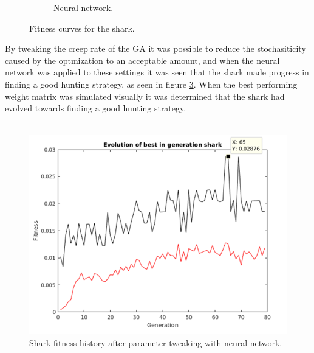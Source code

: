 \begin{figure}[htp]
\begin{center}
\begin{subfigure}[b]{0.5\textwidth}
 \caption[]{Neural network.}
 \label{fig:aifitness1}
\end{subfigure}
\caption{Fitness curves for the shark.}
\label{fig:fitness1}
\end{center}
\end{figure}

By tweaking the creep rate of the GA it was possible to reduce the
stochasiticity caused by the optmization to an acceptable amount, and when the
neural network was applied to these settings it was seen that the shark made
progress in finding a good hunting strategy, as seen in figure
\ref{fig:aifitness2}.
When the best performing weight matrix was simulated visually it was
determined that the shark had evolved towards finding a good hunting strategy.\\
\\
\begin{figure}[htp]
\begin{center}
  \includegraphics[width=\textwidth]{figs/goodfit.png}
  \caption[]{Shark fitness history after parameter tweaking with neural
  network.}
  \label{fig:aifitness2}
\end{center}
\end{figure}


